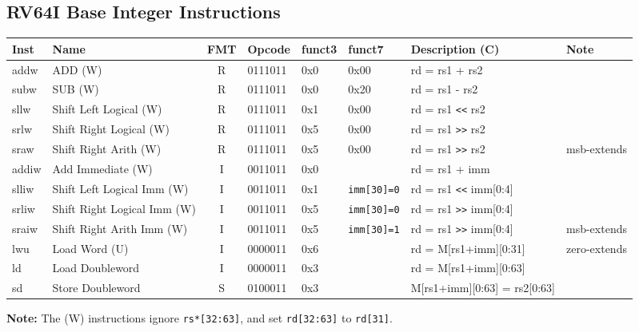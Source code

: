 \subsection*{RV64I Base Integer Instructions}
\begin{center}
\begin{tabular}
{T | l | c | T | T | T | T | l} \hline
\rm Inst & Name              & FMT & \rm Opcode & \rm funct3 & \rm funct7 & \rm Description (C) & \rm Note    \\ \hline
addw & ADD (W) & R & 0111011 & 0x0 & 0x00 & rd = rs1 + rs2 & \\
subw & SUB (W) & R & 0111011 & 0x0 & 0x20 & rd = rs1 - rs2 & \\
sllw & Shift Left Logical (W) & R & 0111011 & 0x1 & 0x00 & rd = rs1 \verb~<<~ rs2 & \\
srlw & Shift Right Logical (W) & R & 0111011 & 0x5 & 0x00 & rd = rs1 \verb~>>~ rs2 & \\
sraw & Shift Right Arith (W) & R & 0111011 & 0x5 & 0x00 & rd = rs1 \verb~>>~ rs2 & msb-extends\\
\hline
addiw & Add Immediate (W) & I & 0011011 & 0x0 &  & rd = rs1 + imm & \\
slliw & Shift Left Logical Imm (W) & I & 0011011 & 0x1 & \texttt{imm[30]=0} & rd = rs1 \verb~<<~ imm[0:4] & \\
srliw & Shift Right Logical Imm (W) & I & 0011011 & 0x5 & \texttt{imm[30]=0} & rd = rs1 \verb~>>~ imm[0:4] & \\
sraiw & Shift Right Arith Imm (W) & I & 0011011 & 0x5 & \texttt{imm[30]=1} & rd = rs1 \verb~>>~ imm[0:4] & msb-extends\\
\hline
lwu & Load Word (U) & I & 0000011 & 0x6 &  & rd = M[rs1+imm][0:31] & zero-extends\\
ld & Load Doubleword & I & 0000011 & 0x3 &  & rd = M[rs1+imm][0:63] & \\
\hline
sd & Store Doubleword & S & 0100011 & 0x3 &  & M[rs1+imm][0:63] = rs2[0:63] & \\
\end{tabular}
\end{center}
\textbf{Note:} The (W) instructions ignore \texttt{rs*[32:63]}, and set \texttt{rd[32:63]} to \texttt{rd[31]}.